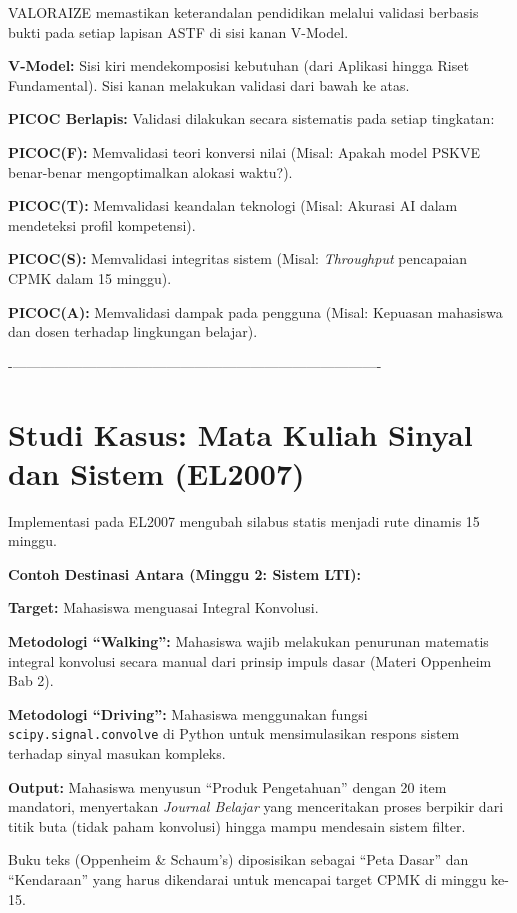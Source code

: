 \documentclass[
  letterpaper,
  DIV=11,
  numbers=noendperiod]{scrreprt}
\begin{document}
VALORAIZE memastikan keterandalan pendidikan melalui validasi berbasis
bukti pada setiap lapisan ASTF di sisi kanan V-Model.

\textbf{V-Model:} Sisi kiri mendekomposisi kebutuhan (dari Aplikasi
hingga Riset Fundamental). Sisi kanan melakukan validasi dari bawah ke
atas.

\textbf{PICOC Berlapis:} Validasi dilakukan secara sistematis pada
setiap tingkatan:

\textbf{PICOC(F):} Memvalidasi teori konversi nilai (Misal: Apakah model
PSKVE benar-benar mengoptimalkan alokasi waktu?).

\textbf{PICOC(T):} Memvalidasi keandalan teknologi (Misal: Akurasi AI
dalam mendeteksi profil kompetensi).

\textbf{PICOC(S):} Memvalidasi integritas sistem (Misal:
\emph{Throughput} pencapaian CPMK dalam 15 minggu).

\textbf{PICOC(A):} Memvalidasi dampak pada pengguna (Misal: Kepuasan
mahasiswa dan dosen terhadap lingkungan belajar).

-\/-------------------------------------------------------------------------------

\section{Studi Kasus: Mata Kuliah Sinyal dan Sistem
(EL2007)}\label{studi-kasus-mata-kuliah-sinyal-dan-sistem-el2007}

Implementasi pada EL2007 mengubah silabus statis menjadi rute dinamis 15
minggu.

\textbf{Contoh Destinasi Antara (Minggu 2: Sistem LTI):}

\textbf{Target:} Mahasiswa menguasai Integral Konvolusi.

\textbf{Metodologi ``Walking'':} Mahasiswa wajib melakukan penurunan
matematis integral konvolusi secara manual dari prinsip impuls dasar
(Materi Oppenheim Bab 2).

\textbf{Metodologi ``Driving'':} Mahasiswa menggunakan fungsi
\texttt{scipy.signal.convolve} di Python untuk mensimulasikan respons
sistem terhadap sinyal masukan kompleks.

\textbf{Output:} Mahasiswa menyusun ``Produk Pengetahuan'' dengan 20
item mandatori, menyertakan \emph{Journal Belajar} yang menceritakan
proses berpikir dari titik buta (tidak paham konvolusi) hingga mampu
mendesain sistem filter.

Buku teks (Oppenheim \& Schaum's) diposisikan sebagai ``Peta Dasar'' dan
``Kendaraan'' yang harus dikendarai untuk mencapai target CPMK di minggu
ke-15.
\end{document}
